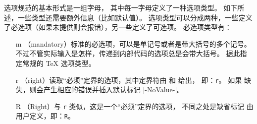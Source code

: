 \documentclass{l3doc}
\begin{document}
选项规范的基本形式是一组字母，
其中每一字母定义了一种选项类型。
如下所述，一些类型还需要额外信息（比如默认值）。
选项类型可以分成两种，一些定义了必选项（如果未提供则会报错），另一些定义了可选项。
必选项类型有：
\begin{itemize}[font=\ttfamily]
    \item[m] （mandatory）标准的必选项，可以是单记号或者是带大括号的多个记号。
    不过不管实际输入是怎样，传递到内部代码的选项总是会带大括号。
     据此指定常规的 \TeX{} 选项类型。
    \item[r] （right）读取“必须”定界的选项，其中定界符由  和  给出，
    即：\texttt{r}。
    如果  缺失，则会产生相应的错误并插入默认标记 |-NoValue-|。
    \item[R] （Right）与 \texttt{r} 类似，这是一个“必须”定界的选项，
    不同之处是缺省标记  由用户定义，即：\texttt{R}。

\end{itemize}
\end{document}
